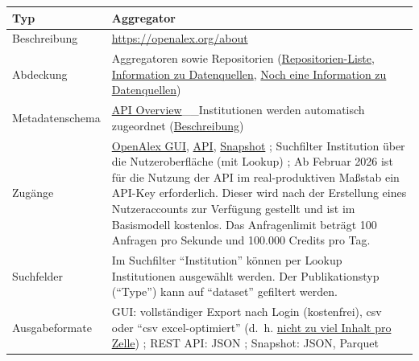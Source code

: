 \documentclass[
  ngerman,
  letterpaper,
  DIV=11]{scrreprt}
\newcounter{none} %
\begin{document}
{\def\LTcaptype{none} %
\begin{longtable}[]{@{}
  >{\raggedright\arraybackslash}p{}
  >{\raggedright\arraybackslash}p{}@{}}
\toprule\noalign{}
\begin{minipage}[b]{\linewidth}\raggedright
Typ
\end{minipage} & \begin{minipage}[b]{\linewidth}\raggedright
Aggregator
\end{minipage} \\
\midrule\noalign{}
\endhead
\bottomrule\noalign{}
\endlastfoot
Beschreibung & \url{https://openalex.org/about} \\
Abdeckung & Aggregatoren sowie Repositorien
(\href{https://openalex.org/sources?page=1&filter=type:repository}{Repositorien-Liste},
\href{https://help.openalex.org/hc/en-us/articles/28932712154391-How-does-OpenAlex-work}{Information
zu Datenquellen},
\href{https://help.openalex.org/hc/en-us/articles/24397285563671-About-the-data}{Noch
eine Information zu Datenquellen}) \\
Metadatenschema &
\href{https://developers.openalex.org/api-reference/introduction}{API
Overview}\_\_Institutionen werden automatisch zugeordnet
(\href{https://help.openalex.org/hc/en-us/articles/24831328396311-Institutions-and-Raw-Affiliation-String-Parsing}{Beschreibung}) \\
Zugänge & \href{https://openalex.org/}{OpenAlex GUI},
\href{https://developers.openalex.org/}{API},
\href{https://developers.openalex.org/download/overview}{Snapshot} ;
Suchfilter Institution über die Nutzeroberfläche (mit Lookup) ; Ab
Februar 2026 ist für die Nutzung der API im real-produktiven Maßstab ein
API-Key erforderlich. Dieser wird nach der Erstellung eines
Nutzeraccounts zur Verfügung gestellt und ist im Basismodell kostenlos.
Das Anfragenlimit beträgt 100 Anfragen pro Sekunde und 100.000 Credits
pro Tag. \\
Suchfelder & Im Suchfilter ``Institution'' können per Lookup
Institutionen ausgewählt werden. Der Publikationstyp (``Type'') kann auf
``dataset'' gefiltert werden. \\
Ausgabeformate & GUI: vollständiger Export nach Login (kostenfrei), csv
oder ``csv excel-optimiert'' (d.~h.
\href{https://help.openalex.org/hc/en-us/articles/24829724234007-Export-results-from-the-OpenAlex-website}{nicht
zu viel Inhalt pro Zelle}) ; REST API: JSON ; Snapshot: JSON, Parquet \\
\end{longtable}
}
\end{document}
